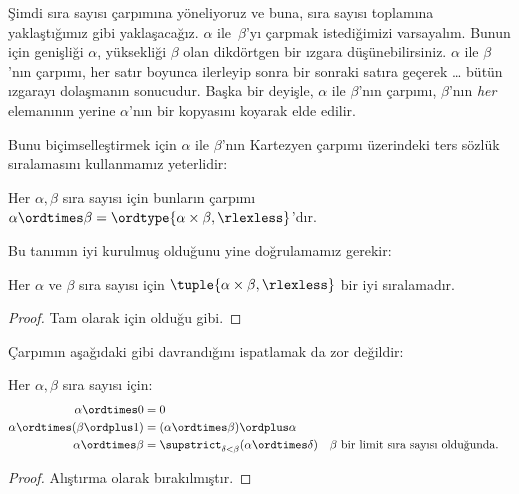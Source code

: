 



Şimdi sıra sayısı çarpımına yöneliyoruz ve buna, sıra sayısı toplamına
yaklaştığımız gibi yaklaşacağız. $\alpha$ ile~$\beta$'yı çarpmak
istediğimizi varsayalım. Bunun için genişliği $\alpha$, yüksekliği $\beta$
olan dikdörtgen bir ızgara düşünebilirsiniz. $\alpha$ ile $\beta$'nın
çarpımı, her satır boyunca ilerleyip sonra bir sonraki satıra geçerek
\ldots{} bütün ızgarayı dolaşmanın sonucudur. Başka bir deyişle, $\alpha$
ile $\beta$'nın çarpımı, $\beta$'nın \emph{her} elemanının yerine
$\alpha$'nın bir kopyasını koyarak elde edilir.

Bunu biçimselleştirmek için $\alpha$ ile $\beta$'nın Kartezyen çarpımı
üzerindeki ters sözlük sıralamasını kullanmamız yeterlidir:

\begin{defn}
Her $\alpha,\beta$ sıra sayısı için bunların çarpımı
$\alpha\ordtimes\beta=\ordtype{\alpha\times\beta,\rlexless}$'dır.
\end{defn}
\noindent
Bu tanımın iyi kurulmuş olduğunu yine doğrulamamız gerekir:

\begin{lem}
Her $\alpha$ ve $\beta$ sıra sayısı için
$\tuple{\alpha\times\beta,\rlexless}$ bir iyi sıralamadır.
\end{lem}

\begin{proof}
Tam olarak  için olduğu gibi.
\end{proof}
\noindent
Çarpımın aşağıdaki gibi davrandığını ispatlamak da zor değildir:

\begin{lem}
Her $\alpha,\beta$ sıra sayısı için:
\begin{align*}
	\alpha \ordtimes 0 &= 0\\
	\alpha \ordtimes (\beta \ordplus 1) &= 
		(\alpha \ordtimes \beta) \ordplus \alpha\\
	\alpha  \ordtimes \beta &= 
		\supstrict_{\delta < \beta}(\alpha \ordtimes \delta) && 
		\text{$\beta$ bir limit sıra sayısı olduğunda.}
\end{align*}
\end{lem}

\begin{proof}
Alıştırma olarak bırakılmıştır.
\end{proof}

